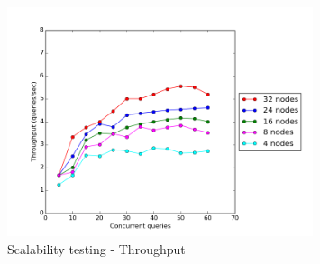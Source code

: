 \begin{figure}[H]
  \centering
  \includegraphics[width=0.8\textwidth]{figures/scalability_throughput.png}
  \caption{Scalability testing - Throughput}
\end{figure}






